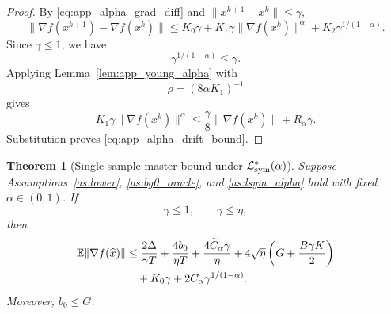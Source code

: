 \documentclass[letter,11pt]{article}
\newtheorem{theorem}{Theorem}[]
\newcommand{\E}{\mathbb{E}}
\begin{document}
\begin{proof}
By \eqref{eq:app_alpha_grad_diff} and \(\|x^{k+1}-x^k\|\le\gamma\),
\[
    \|\nabla f(x^{k+1})-\nabla f(x^k)\|
    \le
    K_0\gamma
    +K_1\gamma\|\nabla f(x^k)\|^\alpha
    +K_2\gamma^{1/(1-\alpha)}.
\]
Since \(\gamma\le1\), we have
\[
    \gamma^{1/(1-\alpha)}\le\gamma.
\]
Applying Lemma~\ref{lem:app_young_alpha} with
\[
    \rho=(8\alpha K_1)^{-1}
\]
gives
\[
    K_1\gamma\|\nabla f(x^k)\|^\alpha
    \le
    \frac{\gamma}{8}\|\nabla f(x^k)\|
    +\widetilde R_\alpha\gamma.
\]
Substitution proves \eqref{eq:app_alpha_drift_bound}.
\end{proof}

\begin{theorem}[Single-sample master bound under \(\mathcal L_{\rm sym}^*(\alpha)\)]
\label{thm:app_alpha_master}
Suppose Assumptions~\ref{as:lower}, \ref{as:bg0_oracle}, and
\ref{as:lsym_alpha} hold with fixed \(\alpha\in(0,1)\). If
\[
    \gamma\le1,
    \qquad
    \gamma\le\eta,
\]
then
\begin{align}
\E\|\nabla f(\widehat x)\|
&\le
\frac{2\Delta}{\gamma T}
+\frac{4b_0}{\eta T}
+\frac{4\widetilde C_\alpha\gamma}{\eta}
+4\sqrt\eta
\left(G+\frac{B\gamma K}{2}\right)
\notag\\
&\quad
+K_0\gamma
+2C_\alpha\gamma^{1/(1-\alpha)}.
\label{eq:app_alpha_master_bound}
\end{align}
Moreover, \(b_0\le G\).
\end{theorem}
\end{document}
